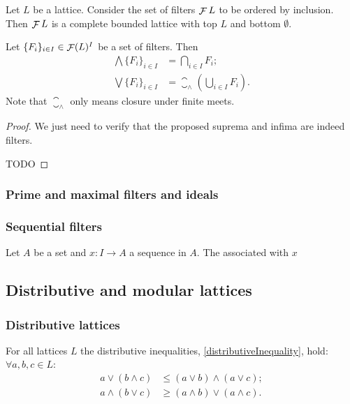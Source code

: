 \begin{proposition}
Let $L$ be a lattice. Consider the set of filters $\mathop{\mathcal{F}}{L}$ to be ordered by inclusion. Then $\mathop{\mathcal{F}}{L}$ is a complete bounded lattice with top $L$ and bottom $\emptyset$.

Let $\{F_i\}_{i\in I} \in \mathop{\mathcal{F}}(L)^I$ be a set of filters. Then
\begin{align*}
\bigwedge \{F_i\}_{i\in I} &= \bigcap_{i\in I}F_i; \\
\bigvee \{F_i\}_{i\in I} &=  \closure_\wedge\left(\bigcup_{i\in I}F_i\right).
\end{align*}
Note that $\closure_\wedge$ only means closure under finite meets.
\end{proposition}
\begin{proof}
We just need to verify that the proposed suprema and infima are indeed filters.

TODO
\end{proof}


\subsubsection{Prime and maximal filters and ideals}

\subsubsection{Sequential filters}
\begin{definition}
Let $A$ be a set and $x: I\to A$ a sequence in $A$. The  associated with $x$
\end{definition}

\subsection{Distributive and modular lattices}
\subsubsection{Distributive lattices}
For all lattices $L$ the distributive inequalities, \ref{distributiveInequality}, hold: $\forall a,b,c \in L$:
\begin{align*}
a \vee (b\wedge c) &\leq (a\vee b) \wedge (a\vee c); \\
a\wedge (b \vee c) &\geq (a\wedge b)\vee (a\wedge c).
\end{align*}

